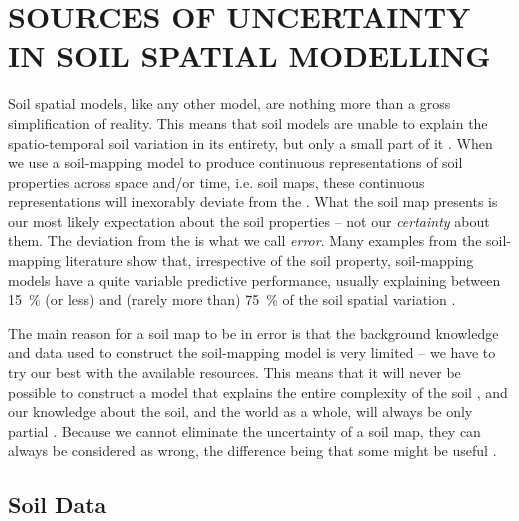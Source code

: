 \section{SOURCES OF UNCERTAINTY IN SOIL SPATIAL MODELLING}

Soil spatial models, like any other model, are nothing more than a gross simplification of reality.
This means that soil models are unable to explain the spatio-temporal soil variation in
its entirety, but only a small part of it \cite{Heuvelink1998a, Legros2006}. When we use a
soil-mapping model to produce continuous representations of soil properties across space and/or time,
i.e. soil maps, these continuous representations will inexorably deviate from the . What
the soil map presents is our most likely expectation about the soil properties -- not our
\emph{certainty} about them. The deviation from the  is what we call \emph{error}. Many
examples from the soil-mapping literature show that, irrespective of the soil property, soil-mapping
models have a quite variable predictive performance, usually explaining between \SI{15}{\percent}
(or less) and (rarely more than) \SI{75}{\percent} of the soil spatial variation
\cite{MooreEtAl1993, OdehEtAl1994, GesslerEtAl1995, McKenzieEtAl1999, GobinEtAl2001, 
SumflethEtAl2008, SunEtAl2012, ViscarraRosselEtAl2013, NussbaumEtAl2014, HenglEtAl2015,
 GaschEtAl2015, HeungEtAl2016}.

The main reason for a soil map to be in error is that the background knowledge and data used to
construct the soil-mapping model is very limited -- we have to try our best with the available
resources. This means that it will never be possible to construct a model that explains the entire complexity 
of the soil \cite{Tukey1997}, and our knowledge about the soil, and the world as a whole,
will always be only partial \cite{Box1993}. Because we cannot eliminate the uncertainty of a soil
map, they can always be considered as wrong, the difference being that some might be useful
\cite{Box1976}.

\subsection{Soil Data}

